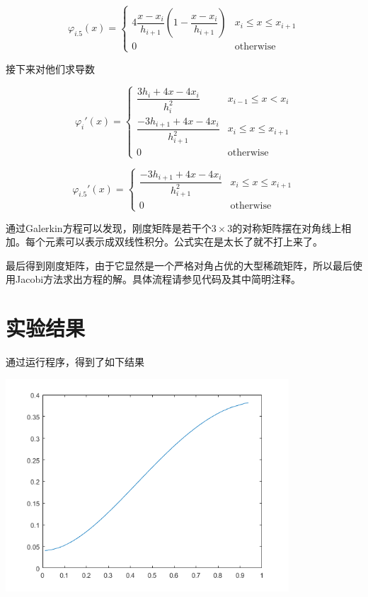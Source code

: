 \documentclass[11pt, a4paper]{article}
\begin{document}
\begin{equation}
	\varphi_{i.5}(x)=\left\{
	\begin{array}{cr}
		4\dfrac{x-x_i}{h_{i+1}}\left(1-\dfrac{x-x_i}{h_{i+1}}\right) & x_{i}\le x\le x_{i+1}\\
		0 & \text{otherwise}
	\end{array}
	\right.
\end{equation}

接下来对他们求导数

\begin{equation}
	\varphi_i'(x)=\left\{
	\begin{array}{cr}
		\dfrac{3h_i+4x-4x_i}{h_i^2} & x_{i-1}\le x<x_i\\
		\dfrac{-3h_{i+1}+4x-4x_i}{h_{i+1}^2} & x_{i}\le x\le x_{i+1}\\
		0 & \text{otherwise}
	\end{array}
	\right.
\end{equation}

\begin{equation}
	\varphi_{i.5}'(x)=\left\{
	\begin{array}{cr}
		\dfrac{-3h_{i+1}+4x-4x_i}{h_{i+1}^2} & x_{i}\le x\le x_{i+1}\\
		0 & \text{otherwise}
	\end{array}
	\right.
\end{equation}

通过Galerkin方程可以发现，刚度矩阵是若干个$3\times 3$的对称矩阵摆在对角线上相加。每个元素可以表示成双线性积分。公式实在是太长了就不打上来了。

最后得到刚度矩阵，由于它显然是一个严格对角占优的大型稀疏矩阵，所以最后使用Jacobi方法求出方程的解。具体流程请参见代码及其中简明注释。

\section{实验结果}

通过运行程序，得到了如下结果

\vspace{10pt}
\includegraphics[width=300pt]{res.png}
\vspace{10pt}
\end{document}
